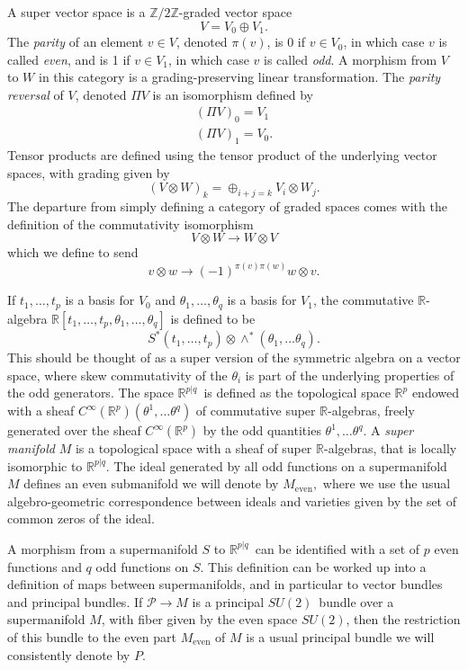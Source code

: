 \documentclass[twoside]{amsart}
\newcommand{\RR}{\ensuremath{\mathbb{R}}}
\newcommand{\ZZ}{\ensuremath{\mathbb{Z}}}
\newcommand{\enm}[1]{\ensuremath{#1}}
\newcommand{\superijk}[3]{\enm{{#1}^{#2|#3}}}
\newcommand{\rrpq}{\superijk{\RR}{p}{q}}
\newcommand{\sut}{\enm{SU(2)}}
\newcommand{\pp}{\enm{\mathcal{P}}}
\begin{document}
\label{sec:superprelims}
A super vector space is a \(\ZZ/2\ZZ\)-graded vector space
\[ V = V_0\oplus V_1.\]
The \emph{parity} of an element \( v\in V \), denoted \( \pi(v) \),
is \( 0 \) if \( v\in V_0 \), in which case \( v \) is called
\emph{even}, and is 1 if \( v\in V_1 \), in which case \( v \) is
called \emph{odd}.
A morphism from \( V \) to \( W \) in this category is a
grading-preserving linear transformation.  The \emph{parity reversal}
of \( V \), denoted \( \Pi V \) is an isomorphism defined by
\begin{gather*}
   \left(\Pi V\right)_0 = V_1 \\
   \left(\Pi V\right)_1 = V_0.
\end{gather*}
Tensor products are defined using the tensor product of the
underlying vector spaces, with grading given by
\[ (V\otimes W)_k = \oplus_{i+j=k}V_i\otimes W_j. \]
The departure from simply defining a category of graded spaces comes
with the definition of the commutativity isomorphism
\[ V\otimes W \to W\otimes V \]
which we define to send
\begin{equation}
   v\otimes w \to (-1)^{\pi(v)\pi(w)}w\otimes v.
\end{equation}

If \( t_1,\ldots,t_p \) is a basis for \( V_0 \) and \( \theta_1,\ldots,\theta_q \) is a basis for \( V_1 \), the commutative \RR-algebra \( \RR[t_1,\ldots,t_p,\theta_1, \ldots,
\theta_q] \) is defined to be
\[ S^*(t_1,\ldots,t_p)\otimes\wedge^*(\theta_1,\ldots\theta_q).\]
This should be thought of as a super version of the symmetric algebra
on a vector space, where skew commutativity of the \( \theta_i
\) is part of the underlying properties of the odd generators.
The
space \rrpq\ is defined as the topological space \( \RR^p \) endowed
with a sheaf \( C^{\infty}(\RR^p)(\theta^1,\ldots\theta^q) \) of
commutative super \RR-algebras, freely generated over the sheaf \(
C^{\infty}(\RR^p) \) by the odd quantities \( \theta^1,\ldots\theta^q
\).  A \emph{super manifold} \( M \) is a topological space with a
sheaf of super \RR-algebras, that is locally isomorphic to \rrpq.  The
ideal generated by all odd functions on a supermanifold \( M \)
defines an even submanifold we will denote by \( M_{\mathrm{even}}, \)
where we use the usual algebro-geometric correspondence between ideals
and varieties given by the set of common zeros of the ideal.

A morphism from a supermanifold \( S \) to \rrpq\ can be identified
with a set of \( p \) even functions and \( q \) odd functions on \(
S \).  This definition can be worked up into a definition of maps
between supermanifolds, and in particular to vector bundles and
principal bundles.  If \( \pp\to M \) is a principal \sut\ bundle
over a supermanifold \( M \), with fiber given by the even space \sut,
then the restriction of this bundle to the even part \(
M_{\mathrm{even}} \) of \( M \) is a usual principal bundle we will
consistently denote by \( P \).
\end{document}
